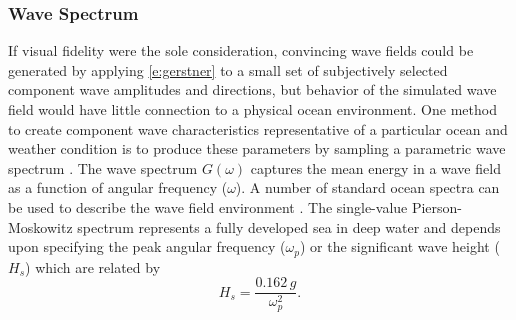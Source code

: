 \documentclass[utf8]{frontiersSCNS} %
\begin{document}
\subsubsection{Wave Spectrum}
If visual fidelity were the sole consideration, convincing wave fields could be generated by applying \eqref{e:gerstner} to a small set of subjectively selected component wave amplitudes and directions, but behavior of the simulated wave field would have little connection to a physical ocean environment.  One method to create component wave characteristics representative of a particular ocean and weather condition is to produce these parameters by sampling a parametric wave spectrum \citep{mastin87fourier,thon00ocean,frechot06realistic}.  The wave spectrum  $G(\omega)$ captures the mean energy in a wave field as a function of angular frequency ($\omega$).  A number of standard ocean spectra can be used to describe the wave field environment \citep{ittc02waves}.
The single-value Pierson-Moskowitz spectrum represents a fully developed sea in deep water and depends upon specifying  the peak angular frequency ($\omega_p$) or the significant wave height ($H_s$) which are related by
\begin{equation}
  H_s = \frac{0.162 \, g}{\omega_p^2}.
  \label{e:pmh}
\end{equation}
\end{document}
